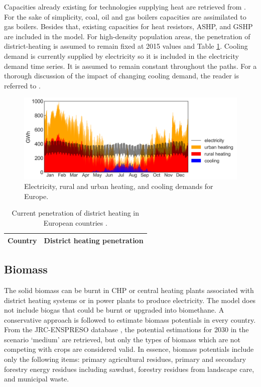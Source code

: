 \documentclass[3p]{elsarticle} %
\begin{document}
Capacities already existing for technologies supplying heat are retrieved from \cite{heating_capacities}. For the sake of simplicity, coal, oil and gas boilers capacities are assimilated to gas boilers. Besides that, existing capacities for heat resistors, ASHP, and GSHP are included in the model. For high-density population areas, the penetration of district-heating is assumed to remain fixed at 2015 values \cite{DH_penetration} and Table \ref{tab_DH_penetration}. Cooling demand is currently supplied by electricity so it is included in the electricity demand time series. It is assumed to remain constant throughout the paths. For a thorough discussion of the impact of changing cooling demand, the reader is referred to \cite{Zhu_2020}.


\begin{figure}[!h]
	\centering
	\includegraphics[width=0.9\columnwidth]{figures/demands.png}
	\caption{Electricity, rural and urban heating, and cooling demands for Europe.} \label{fig_demands} 
\end{figure}



\begin{table}[!b]
\footnotesize
\centering
\begin{threeparttable}
\caption{Current penetration of district heating in European countries \cite{DH_penetration}.} \label{tab_DH_penetration}
\centering
\begin{tabularx}{5.5cm}{lc}
\toprule
Country & District heating penetration  \\
\midrule

\bottomrule
\end{tabularx}
\end{threeparttable}
\end{table}


\subsection{Biomass}
The solid biomass can be burnt in CHP or central heating plants associated with district heating systems or in power plants to produce electricity. The model does not include biogas that could be burnt or upgraded into biomethane. A conservative approach is followed to estimate biomass potentials in every country. From the JRC-ENSPRESO database \cite{JRC_biomass, ENSPRESO}, the potential estimations for 2030 in the scenario `medium' are retrieved, but only the types of biomass which are not competing with crops are considered valid. In essence, biomass potentials include only the following items: primary agricultural residues, primary and secondary forestry energy residues including sawdust, forestry residues from landscape care, and municipal waste.
\end{document}
